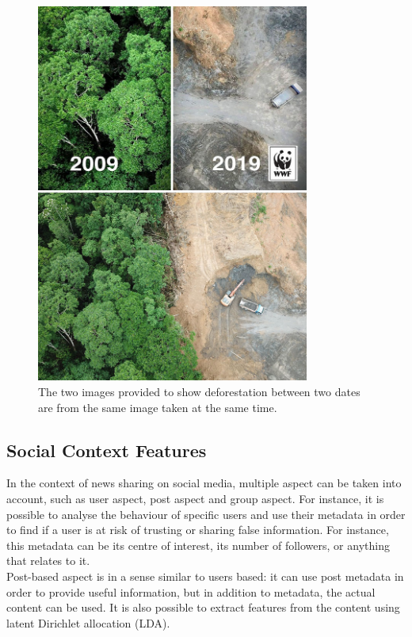 \begin{figure}
 \centering
 \includegraphics[width=0.8\textwidth]{images/introduction/fake-news-photos-viral-photoshop-8-5c6fe61f88240__700}
 \caption{The two images provided to show deforestation between two dates are from the same image taken at the same time.}
 \label{fig:intro:deforestation}
\end{figure}

\subsection{Social Context Features}
In the context of news sharing on social media, multiple aspect can be taken into account, such as user aspect, post aspect and group aspect. For instance, it is possible to analyse the behaviour of specific users and use their metadata in order to find if a user is at risk of trusting or sharing false information. For instance, this metadata can be its centre of interest, its number of followers, or anything that relates to it. \\

Post-based aspect is in a sense similar to users based: it can use post metadata in order to provide useful information, but in addition to metadata, the actual content can be used. It is also possible to extract features from the content using latent Dirichlet allocation (LDA)\cite{blei2003latent}.

